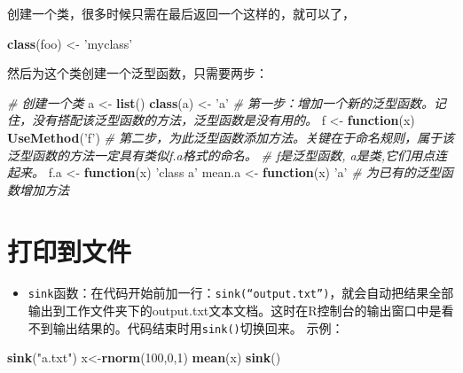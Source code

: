 \documentclass[
]{book}
\newenvironment{Shaded}{\begin{snugshade}}{\end{snugshade}}
\newcommand{\CommentTok}[1]{\textcolor[rgb]{0.56,0.35,0.01}{\textit{#1}}}
\newcommand{\ControlFlowTok}[1]{\textcolor[rgb]{0.13,0.29,0.53}{\textbf{#1}}}
\newcommand{\DecValTok}[1]{\textcolor[rgb]{0.00,0.00,0.81}{#1}}
\newcommand{\KeywordTok}[1]{\textcolor[rgb]{0.13,0.29,0.53}{\textbf{#1}}}
\newcommand{\NormalTok}[1]{#1}
\newcommand{\StringTok}[1]{\textcolor[rgb]{0.31,0.60,0.02}{#1}}
\providecommand{\tightlist}{%
  \setlength{\itemsep}{0pt}\setlength{\parskip}{0pt}}
\begin{document}
创建一个类，很多时候只需在最后返回一个这样的，就可以了，

\begin{Shaded}
\begin{Highlighting}[]
\KeywordTok{class}\NormalTok{(foo) <-}\StringTok{ 'myclass'}   
\end{Highlighting}
\end{Shaded}

然后为这个类创建一个泛型函数，只需要两步：

\begin{Shaded}
\begin{Highlighting}[]
\CommentTok{# 创建一个类}
\NormalTok{a <-}\StringTok{ }\KeywordTok{list}\NormalTok{()}
\KeywordTok{class}\NormalTok{(a) <-}\StringTok{ 'a'}
\CommentTok{# 第一步：增加一个新的泛型函数。记住，没有搭配该泛型函数的方法，泛型函数是没有用的。}
\NormalTok{f <-}\StringTok{ }\ControlFlowTok{function}\NormalTok{(x) }\KeywordTok{UseMethod}\NormalTok{(}\StringTok{'f'}\NormalTok{) }
\CommentTok{# 第二步，为此泛型函数添加方法。关键在于命名规则，属于该泛型函数的方法一定具有类似f.a格式的命名。}
\CommentTok{# f是泛型函数, a是类,它们用点连起来。}
\NormalTok{f.a <-}\StringTok{ }\ControlFlowTok{function}\NormalTok{(x) }\StringTok{'class a'}
\NormalTok{mean.a <-}\StringTok{ }\ControlFlowTok{function}\NormalTok{(x) }\StringTok{'a'} \CommentTok{# 为已有的泛型函数增加方法}
\end{Highlighting}
\end{Shaded}

\hypertarget{ux6253ux5370ux5230ux6587ux4ef6}{%
\section{打印到文件}\label{ux6253ux5370ux5230ux6587ux4ef6}}

\begin{itemize}
\tightlist
\item
  \texttt{sink}函数：在代码开始前加一行：\texttt{sink(“output.txt”)}，就会自动把结果全部输出到工作文件夹下的output.txt文本文档。这时在R控制台的输出窗口中是看不到输出结果的。代码结束时用\texttt{sink()}切换回来。 示例：
\end{itemize}

\begin{Shaded}
\begin{Highlighting}[]
\KeywordTok{sink}\NormalTok{(}\StringTok{"a.txt"}\NormalTok{) }
\NormalTok{x<-}\KeywordTok{rnorm}\NormalTok{(}\DecValTok{100}\NormalTok{,}\DecValTok{0}\NormalTok{,}\DecValTok{1}\NormalTok{) }
\KeywordTok{mean}\NormalTok{(x) }
\KeywordTok{sink}\NormalTok{()}
\end{Highlighting}
\end{Shaded}
\end{document}
